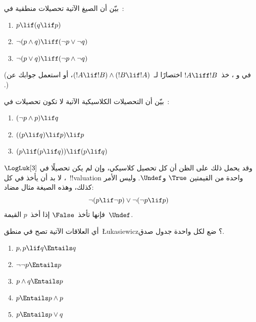 \documentclass[../../../include/open-logic-section]{subfiles}
\begin{document}
\begin{prob}
  بيّن أن الصيغ الآتية تحصيلات منطقية في~\LogLuk[3]:
  \begin{enumerate}
    \item $p \lif (q \lif p)$
    \item\label{mvl:thr:luk:prob:luk-taut-2} $\lnot(p \land q) \liff (\lnot p \lor \lnot q)$
    \item\label{mvl:thr:luk:prob:luk-taut-3} $\lnot(p \lor q) \liff (\lnot p \land \lnot q)$
  \end{enumerate}
  (في  و
  ، خذ~$!A \liff !B$
  اختصارًا لـ~$(!A \lif !B) \land (!B \lif !A)$، أو استعمل جوابك
  عن .)
\end{prob}

\begin{prob}
  بيّن أن التحصيلات الكلاسيكية الآتية لا تكون تحصيلات في~\LogLuk[3]:
  \begin{enumerate}
    \item $(\lnot p \land p) \lif q$
    \item $((p \lif q) \lif p) \lif p$
    \item $(p \lif (p \lif q)) \lif (p \lif q)$
  \end{enumerate}
\end{prob}

وقد يحمل ذلك على الظن أن كل تحصيل كلاسيكي، وإن لم يكن تحصيلًا في
$\LogLuk[3]$، لا بد أن يأخذ في كل~!!{valuation} واحدة من القيمتين
$\True$ و$\Undef$. وليس الأمر كذلك، وهذه الصيغة مثال مضاد:
\[
  \lnot(p \lif \lnot p) \lor \lnot(\lnot p \lif p)
\]
فإنها تأخذ~$\False$ إذا أخذ~$p$ القيمة~$\Undef$.

\begin{prob}
  أي العلاقات الآتية تصح في منطق~\L ukasiewicz؟ ضع لكل واحدة جدول صدق.
  \begin{enumerate}
    \item $p, p \lif q \Entails q$
    \item $\lnot\lnot p \Entails p$
    \item $p \land q \Entails p$
    \item $p \Entails p \land p$
    \item $p \Entails p \lor q$
  \end{enumerate}
\end{prob}
\end{document}
